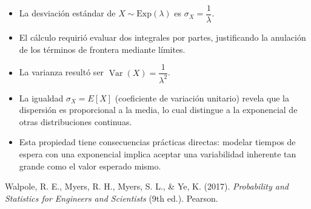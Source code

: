 \documentclass{article}
\theoremstyle{definition}
\begin{document}
    \begin{itemize}
        \item La desviación estándar de $X \sim \mathrm{Exp}(\lambda)$ es $\sigma_X = \dfrac{1}{\lambda}$.
        \item El cálculo requirió evaluar dos integrales por partes, justificando la anulación de los términos de frontera mediante límites.
        \item La varianza resultó ser $\operatorname{Var}(X) = \dfrac{1}{\lambda^2}$.
        \item La igualdad $\sigma_X = E[X]$ (coeficiente de variación unitario) revela que la dispersión es proporcional a la media, lo cual distingue a la exponencial de otras distribuciones continuas.
        \item Esta propiedad tiene consecuencias prácticas directas: modelar tiempos de espera con una exponencial implica aceptar una variabilidad inherente tan grande como el valor esperado mismo.
    \end{itemize}

    \begin{thebibliography}{}

    Walpole, R. E., Myers, R. H., Myers, S. L., \& Ye, K. (2017).
    \textit{Probability and Statistics for Engineers and Scientists} (9th ed.).
    Pearson.

    \end{thebibliography}
\end{document}
